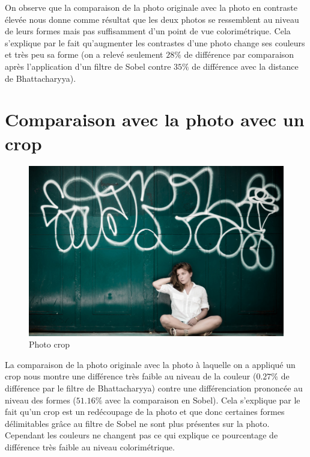 \documentclass[]{article}
\begin{document}
On observe que la comparaison de la photo originale avec la photo en
contraste élevée nous donne comme résultat que les deux photos se
ressemblent au niveau de leurs formes mais pas suffisamment d'un point
de vue colorimétrique. Cela s'explique par le fait qu'augmenter les
contrastes d'une photo change ses couleurs et très peu sa forme (on a
relevé seulement $28\%$ de différence par comparaison après
l'application d'un filtre de Sobel contre $35\%$ de différence avec la
distance de Bhattacharyya).

\newpage

\section{Comparaison avec la photo avec un
crop}\label{comparaison-avec-la-photo-avec-un-crop}

\begin{figure}[htbp]
\centering
\includegraphics{photos/crop.jpg}
\caption{Photo crop}
\end{figure}

La comparaison de la photo originale avec la photo à laquelle on a
appliqué un crop nous montre une différence très faible au niveau de la
couleur ($0.27\%$ de différence par le filtre de Bhattacharyya) contre
une différenciation prononcée au niveau des formes ($51.16\%$ avec la
comparaison en Sobel). Cela s'explique par le fait qu'un crop est un
redécoupage de la photo et que donc certaines formes délimitables grâce
au filtre de Sobel ne sont plus présentes sur la photo. Cependant les
couleurs ne changent pas ce qui explique ce pourcentage de différence
très faible au niveau colorimétrique.

\newpage
\end{document}
